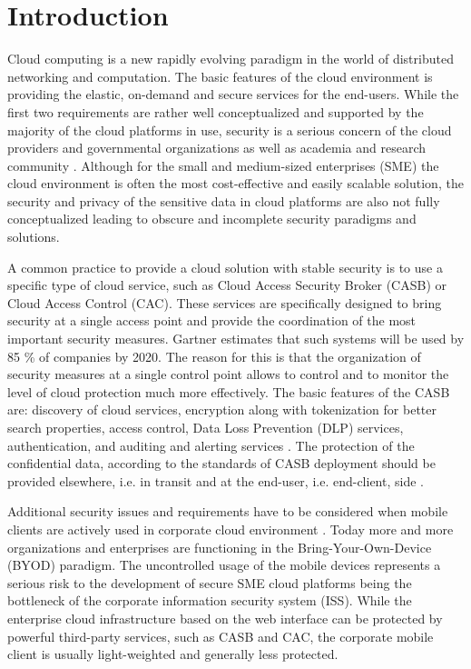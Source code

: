 \documentclass[twocolumn]{svjour3}          	%
\begin{document}

\section{Introduction}
\label{sec_intro}
Cloud computing is a new rapidly evolving paradigm in the world of distributed networking and computation. The basic features of the cloud environment is providing the elastic, on-demand and secure services for the end-users. While the first two requirements are rather well conceptualized and supported by the majority of the cloud platforms in use, security is a serious concern of the cloud providers and governmental organizations as well as academia and research community \cite{csa2016,higashi2015,gartner2015}. Although for the small and medium-sized enterprises (SME) the cloud environment is often the most cost-effective and easily scalable solution, the security and privacy of the sensitive data in cloud platforms are also not fully conceptualized leading to obscure and incomplete security paradigms and solutions.

A common practice to provide a cloud solution with stable security is to use a specific type of cloud service, such as Cloud Access Security Broker (CASB) or Cloud Access Control (CAC). These services are specifically designed to bring security at a single access point and provide the coordination of the most important security measures. Gartner \cite{skyhigh2015} estimates that such systems will be used by 85 \%  of companies by 2020. The reason for this is that the organization of security measures at a single control point allows to control and to monitor the level of cloud protection much more effectively. The basic features of the CASB are: discovery of cloud services, encryption along with tokenization for better search properties, access control, Data Loss Prevention (DLP) services, authentication, and auditing and alerting services \cite{lawson2015}. The protection of the confidential data, according to the standards of CASB deployment should be provided elsewhere, i.e. in transit and at the end-user, i.e. end-client, side \cite{campbell2015}.

Additional security issues and requirements have to be considered when mobile clients are actively used in corporate cloud environment \cite{yovel2014}. Today more and more organizations and enterprises are functioning in the Bring-Your-Own-Device (BYOD) paradigm. The uncontrolled usage of the mobile devices represents a serious risk to the development of secure SME cloud platforms being the bottleneck of the corporate information security system (ISS). While the enterprise cloud infrastructure based on the web interface can be protected by powerful third-party services, such as CASB and CAC, the corporate mobile client is usually light-weighted and generally less protected. 
\end{document}
